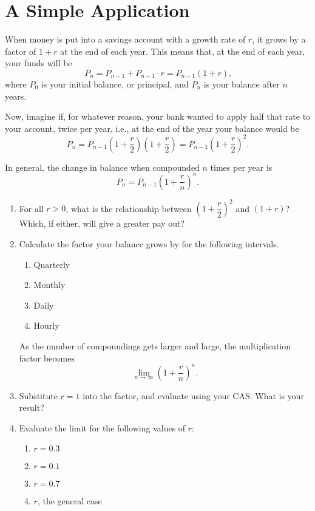 \documentclass{ximera}
\begin{document}
\section{A Simple Application}
When money is put into a savings account with a growth rate of $r$, it grows by a factor of $1 + r$ at the end of each year. This means that, at the end of each year, your funds will be $$P_n = P_{n-1}+P_{n-1} \cdot r= P_{n-1}(1+r)\text{,}$$ where $P_{0}$ is your initial balance, or principal, and $P_{n}$ is your balance after $n$ years.

Now, imagine if, for whatever reason, your bank wanted to apply half that rate to your account, twice per year, i.e., at the end of the year your balance would be $$P_n = P_{n-1}\left(1+\dfrac{r}{2}\right)\left(1+\dfrac{r}{2}\right) = P_{n-1}\left(1+\dfrac{r}{2}\right)^2\text{.}$$

In general, the change in balance when compounded $n$ times per year is $$P_n = P_{n-1}\left(1+\dfrac{r}{n}\right)^n\text{.}$$

\begin{enumerate}
\item For all $r > 0$, what is the relationship between $\left(1+\dfrac{r}{2}\right)^2$ and $(1 + r)$? Which, if either, will give a greater pay out?
\item Calculate the factor your balance grows by for the following intervals.
\begin{enumerate}
\item Quarterly
\item Monthly
\item Daily
\item Hourly
\end{enumerate}
As the number of compoundings gets larger and large, the multiplication factor becomes $$\lim_{n \to \infty}\left(1 + \dfrac{r}{n}\right)^n \text{.}$$
\item Substitute $r = 1$ into the factor, and evaluate using your CAS. What is your result?
\item Evaluate the limit for the following values of $r$:
\begin{enumerate}
\item $r = 0.3$
\item $r = 0.1$
\item $r = 0.7$
\item $r$, the general case
\end{enumerate}
\end{enumerate}
\end{document}
